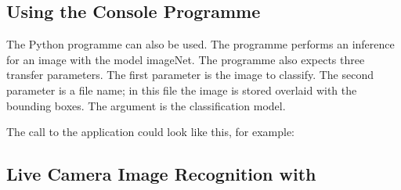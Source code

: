 %
%
%
%
%
%
%
%
%
%
%
%
%






\subsection{Using the Console Programme }

The Python programme  can also be used. The programme performs an inference for an image with the model imageNet. The programme also expects three transfer parameters. The first parameter is the image to classify. The second parameter is a file name; in this file the image is stored overlaid with the bounding boxes. The argument is the classification model. 


\medskip

The call to the application could look like this, for example:

\medskip




\subsection{Live Camera Image Recognition with }

